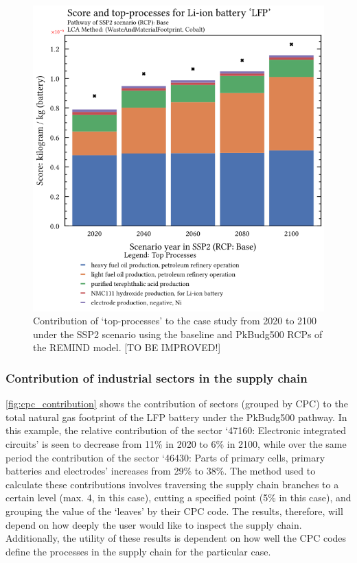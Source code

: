 \begin{figure}[H]
    \centering
    \includegraphics[width=0.6\linewidth]{figures/top-processes.png}
    \caption{Contribution of `top-processes' to the case study from 2020 to 2100 under the SSP2 scenario using the baseline and PkBudg500 RCPs of the REMIND model. [TO BE IMPROVED!]}\label{fig:top_contribution}
\end{figure}

\subsubsection{Contribution of industrial sectors in the supply chain}\label{sec:results-case_study-topsectors}

\autoref{fig:cpc_contribution} shows the contribution of sectors (grouped by CPC) to the total natural gas footprint of the LFP battery under the PkBudg500 pathway. In this example, the relative contribution of the sector `47160: Electronic integrated circuits' is seen to decrease from 11\% in 2020 to 6\% in 2100, while over the same period the contribution of the sector `46430: Parts of primary cells, primary batteries and electrodes' increases from 29\% to 38\%. The method used to calculate these contributions involves traversing the supply chain branches to a certain level (max. 4, in this case), cutting a specified point (5\% in this case), and grouping the value of the `leaves' by their CPC code. The results, therefore, will depend on how deeply the user would like to inspect the supply chain. Additionally, the utility of these results is dependent on how well the CPC codes define the processes in the supply chain for the particular case. 

